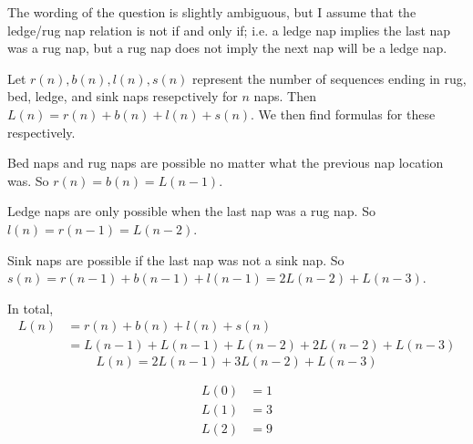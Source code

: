 \documentclass[12pt]{exam}
\begin{document}
\begin{solution}
    The wording of the question is slightly ambiguous, but I assume that the ledge/rug nap relation is not if and only if; i.e. a ledge nap implies the last nap was a rug nap, but a rug nap does not imply the next nap will be a ledge nap.
    \begin{qparts}
        \item Let $r(n), b(n), l(n), s(n)$ represent the number of sequences ending in rug, bed, ledge, and sink naps resepctively for $n$ naps. Then $L(n) = r(n) + b(n) + l(n) + s(n)$. We then find formulas for these respectively. 
        \par Bed naps and rug naps are possible no matter what the previous nap location was. So $r(n) = b(n) = L(n-1)$.
        \par Ledge naps are only possible when the last nap was a rug nap. So $l(n) = r(n-1) = L(n-2)$.
        \par Sink naps are possible if the last nap was not a sink nap. So $s(n) = r(n - 1) + b(n - 1) + l(n - 1) = 2L(n-2) + L(n-3)$.
        \par In total, \begin{align*}
            L(n) &= r(n) + b(n) + l(n) + s(n) \\
            &=  L(n-1) + L(n-1) + L(n-2) + 2L(n-2) + L(n-3)
        \end{align*}
        \[ \boxed{L(n) = 2L(n-1) + 3L(n-2) + L(n-3)} \]
        \item \begin{align*}
            L(0) &= 1 \\
            L(1) &= 3 \\
            L(2) &= 9
        \end{align*}
    \end{qparts}
\end{solution}

\pagebreak
\end{document}
